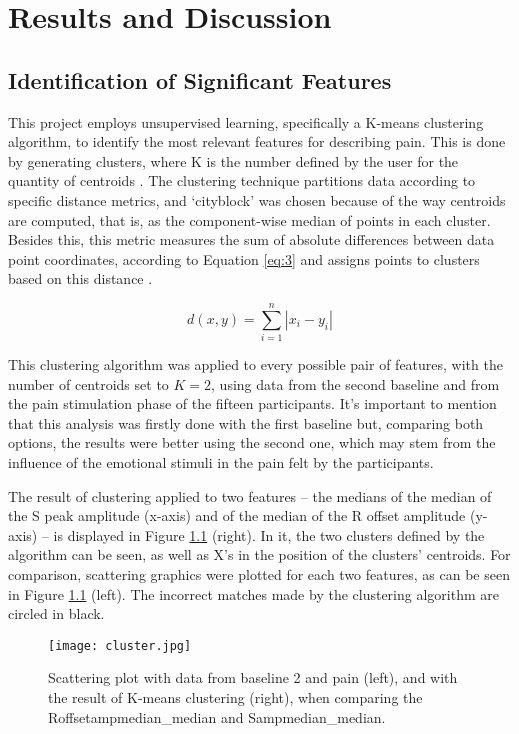 \chapter{Results and Discussion}

\section{Identification of Significant Features}

This project employs unsupervised learning, specifically a K-means clustering algorithm, to identify the most relevant features for describing pain. This is done by generating clusters, where K is the number defined by the user for the quantity of centroids \cite{Ikotun2023}. The clustering technique partitions data according to specific distance metrics, and `cityblock' was chosen because of the way centroids are computed, that is, as the component-wise median of points in each cluster. Besides this, this metric measures the sum of absolute differences between data point coordinates, according to Equation \ref{eq:3} and assigns points to clusters based on this distance \cite{Ricken2023}.

\begin{equation} \label{eq:3}
d(x,y)=\sum_{i=1}^{n}\left| x_i-y_i \right|
\end{equation}

This clustering algorithm was applied to every possible pair of features, with the number of centroids set to $K=2$, using data from the second baseline and from the pain stimulation phase of the fifteen participants. It's important to mention that this analysis was firstly done with the first baseline but, comparing both options, the results were better using the second one, which may stem from the influence of the emotional stimuli in the pain felt by the participants.

The result of clustering applied to two features -- the medians of the median of the S peak amplitude (x-axis) and of the median of the R offset amplitude (y-axis) -- is displayed in Figure \ref{fig:cluster} (right). In it, the two clusters defined by the algorithm can be seen, as well as X's in the position of the clusters' centroids.
For comparison, scattering graphics were plotted for each two features, as can be seen in Figure \ref{fig:cluster} (left). The incorrect matches made by the clustering algorithm are circled in black.

\begin{figure}[h!]
    \centering
    \texttt{[image: cluster.jpg]}
    \caption{Scattering plot with data from baseline 2 and pain (left), and with the result of K-means clustering (right), when comparing the Roffsetampmedian\_median and Sampmedian\_median.}
    \label{fig:cluster}
\end{figure}

